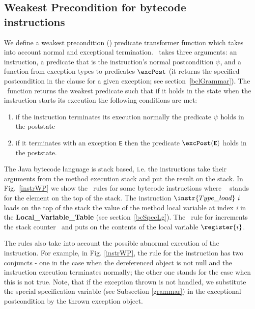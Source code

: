 \subsection{Weakest Precondition for bytecode \\instructions}\label{wpInstr}
We define a weakest precondition (\wpi) predicate transformer function which takes into account normal and exceptional termination. 
\wpi \ takes three arguments: an instruction, a predicate that is the instruction's normal postcondition $\psi$, and a function
from exception types to predicates $\excPost$ (it returns the specified postcondition in the  clause for a given exception; see section~\ref{bclGrammar}).
The \wpi \ function returns the weakest predicate such that if it holds in the state when the instruction starts its execution the following conditions are met: 
\begin{enumerate}
	\item if the instruction terminates its execution normally the predicate $\psi$ holds in the poststate 
	\item if it terminates with an exception \texttt{E} then the predicate $\excPost(\tt{E})$ holds in the poststate.
\end{enumerate}


 The Java bytecode language is stack based, i.e. the instructions take their arguments from the method execution stack and 
 put the result on the stack. In Fig.~\ref{instrWP} we show the \wpi \ rules for some bytecode instructions 
where  \stack{\counter}~ stands for the element on the top of the stack. 
 The instruction $\instr{Type\_load} \ i$  loads on the top of the stack the value of the method local variable at index \textit{i}
 in the \textbf{Local\_Variable\_Table} (see section~\ref{bcSpecLg}). The \wpi \ rule for   increments the stack
counter \counter \ and puts on \stack{\counter} the contents of the local variable $\register{i}$.


The rules also take into account the possible abnormal execution of the instruction. For example, in Fig. \ref{instrWP}, the rule for the instruction 
has two conjuncts - one in the case when the dereferenced object is not null and the instruction execution terminates normally; the other one stands for the case when this is not true. Note, that if the exception thrown is not handled,
 we substitute the special specification variable  (see Subsection \ref{grammar}) in the exceptional postcondition by the thrown exception object.     



